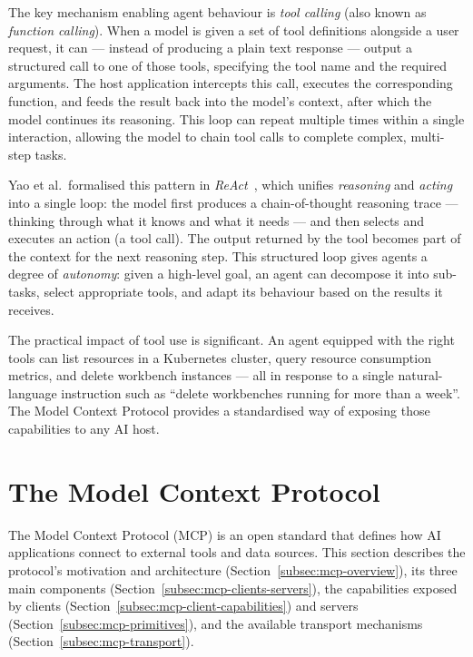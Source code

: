 \documentclass[
  digital,     %
  oneside,     %
  nosansbold,  %
  nocolorbold, %
  lof,         %
  lot,         %
]{fithesis4}
\begin{document}
The key mechanism enabling agent behaviour is \textit{tool calling} (also
known as \textit{function calling}). When a model is given a set of tool
definitions alongside a user request, it can --- instead of producing a plain
text response --- output a structured call to one of those tools, specifying
the tool name and the required arguments. The host application intercepts
this call, executes the corresponding function, and feeds the result back
into the model's context, after which the model continues its reasoning.
This loop can repeat multiple times within a single interaction, allowing the
model to chain tool calls to complete complex, multi-step tasks.

Yao et al.\ formalised this pattern in \textit{ReAct}~\parencite{yao2022react},
which unifies \textit{reasoning} and \textit{acting} into a single loop:
the model first produces a chain-of-thought reasoning trace --- thinking
through what it knows and what it needs --- and then selects and executes an
action (a tool call). The output returned by the tool becomes part of the
context for the next reasoning step. This structured loop gives agents a
degree of \textit{autonomy}: given a high-level goal, an agent can decompose
it into sub-tasks, select appropriate tools, and adapt its behaviour based on
the results it receives.

The practical impact of tool use is significant. An agent equipped with the
right tools can list resources in a Kubernetes cluster, query resource
consumption metrics, and delete workbench instances --- all in response to a
single natural-language instruction such as \enquote{delete workbenches
running for more than a week}. The Model Context Protocol provides a
standardised way of exposing those capabilities to any AI host.

\section{The Model Context Protocol}
\label{sec:mcp}

The Model Context Protocol (MCP) is an open standard that defines how AI
applications connect to external tools and data sources. This section
describes the protocol's motivation and architecture
(Section~\ref{subsec:mcp-overview}), its three main components
(Section~\ref{subsec:mcp-clients-servers}), the capabilities exposed by
clients (Section~\ref{subsec:mcp-client-capabilities}) and servers
(Section~\ref{subsec:mcp-primitives}), and the available transport
mechanisms (Section~\ref{subsec:mcp-transport}).
\end{document}

